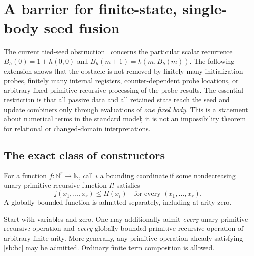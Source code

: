 \documentclass[11pt,letterpaper]{article}
\theoremstyle{definition}\newtheorem{definition}[theorem]{Definition}
\theoremstyle{remark}\newtheorem{remark}[theorem]{Remark}
\begin{document}
\section{A barrier for finite-state, single-body seed fusion}
\label{sec:single-body-barrier}

The current tied-seed obstruction~\cite{transient,counter} concerns the particular scalar recurrence
$B_h(0)=1+h(0,0)$ and $B_h(m+1)=h(m,B_h(m))$.  The following extension
shows that the obstacle is not removed by finitely many initialization
probes, finitely many internal registers, counter-dependent probe locations,
or arbitrary fixed primitive-recursive processing of the probe results.
The essential restriction is that all passive data and all retained state
reach the seed and update combiners only through evaluations of
\emph{one fixed body}.  This is a statement about numerical terms in the
standard model; it is not an impossibility theorem for relational or
changed-domain interpretations.

\subsection{The exact class of constructors}

For a function $f:\mathbb N^r\to\mathbb N$, call $i$ a bounding coordinate
if some nondecreasing unary primitive-recursive function $H$ satisfies
\[
 f(x_1,\ldots,x_r)\le H(x_i)
 \quad\text{for every }(x_1,\ldots,x_r).
 \tag{BC}\label{sb:bc}
\]
A globally bounded function is admitted separately, including at arity zero.

Start with variables and zero.  One may additionally admit \emph{every}
unary primitive-recursive operation and \emph{every} globally bounded
primitive-recursive operation of arbitrary finite arity.  More generally,
any primitive operation already satisfying \eqref{sb:bc} may be admitted.
Ordinary finite term composition is allowed.
\end{document}
